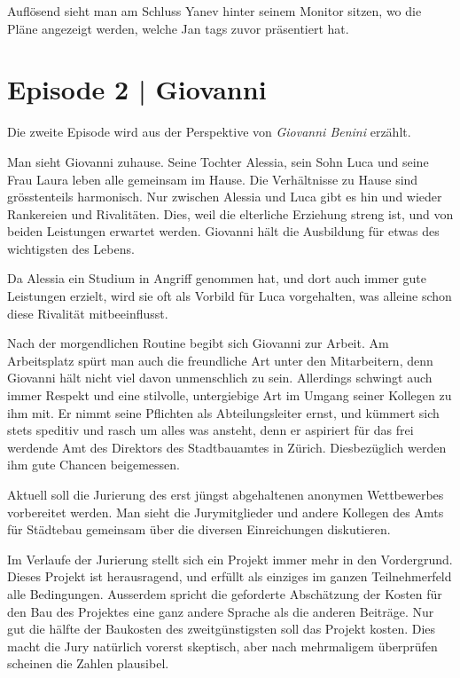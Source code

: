 \documentclass[11pt,a4paper,ngerman]{scrreprt}
\begin{document}
Auflösend sieht man am Schluss Yanev hinter seinem Monitor sitzen, wo die Pläne
angezeigt werden, welche Jan tags zuvor präsentiert hat.

\section*{Episode 2 | Giovanni}

Die zweite Episode wird aus der Perspektive von \emph{Giovanni Benini} erzählt.

Man sieht Giovanni zuhause. Seine Tochter Alessia, sein Sohn Luca und seine Frau
Laura leben alle gemeinsam im Hause. Die Verhältnisse zu Hause sind
grösstenteils harmonisch. Nur zwischen Alessia und Luca gibt es hin und wieder
Rankereien und Rivalitäten. Dies, weil die elterliche Erziehung streng ist, und
von beiden Leistungen erwartet werden. Giovanni hält die Ausbildung für etwas
des wichtigsten des Lebens.

Da Alessia ein Studium in Angriff genommen hat, und dort auch immer gute
Leistungen erzielt, wird sie oft als Vorbild für Luca vorgehalten, was alleine
schon diese Rivalität mitbeeinflusst.

Nach der morgendlichen Routine begibt sich Giovanni zur Arbeit. Am Arbeitsplatz
spürt man auch die freundliche Art unter den Mitarbeitern, denn Giovanni hält
nicht viel davon unmenschlich zu sein. Allerdings schwingt auch immer Respekt
und eine stilvolle, untergiebige Art im Umgang seiner Kollegen zu ihm mit. Er
nimmt seine Pflichten als Abteilungsleiter ernst, und kümmert sich stets
speditiv und rasch um alles was ansteht, denn er aspiriert für das frei werdende
Amt des Direktors des Stadtbauamtes in Zürich. Diesbezüglich werden ihm gute
Chancen beigemessen.

Aktuell soll die Jurierung des erst jüngst abgehaltenen anonymen Wettbewerbes
vorbereitet werden. Man sieht die Jurymitglieder und andere Kollegen des Amts
für Städtebau gemeinsam über die diversen Einreichungen diskutieren.

Im Verlaufe der Jurierung stellt sich ein Projekt immer mehr in den
Vordergrund. Dieses Projekt ist herausragend, und erfüllt als einziges im ganzen
Teilnehmerfeld alle Bedingungen. Ausserdem spricht die geforderte Abschätzung
der Kosten für den Bau des Projektes eine ganz andere Sprache als die anderen
Beiträge. Nur gut die hälfte der Baukosten des zweitgünstigsten soll das Projekt
kosten. Dies macht die Jury natürlich vorerst skeptisch, aber nach mehrmaligem
überprüfen scheinen die Zahlen plausibel.
\end{document}
